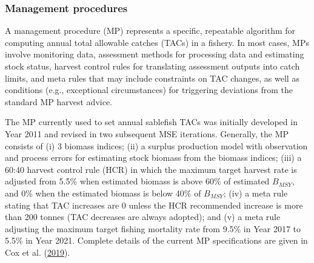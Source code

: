 \documentclass[11pt]{book}
\begin{document}
\hypertarget{management-procedures}{%
\subsubsection{Management procedures}\label{management-procedures}}

A management procedure (MP) represents a specific, repeatable algorithm for computing annual total allowable catches (TACs) in a fishery. In most cases, MPs involve monitoring data, assessment methods for processing data and estimating stock status, harvest control rules for translating assessment outputs into catch limits, and meta rules that may include constraints on TAC changes, as well as conditions (e.g., exceptional circumstances) for triggering deviations from the standard MP harvest advice.

The MP currently used to set annual sablefish TACs was initially developed in Year 2011 and revised in two subsequent MSE iterations. Generally, the MP consists of (i) 3 biomass indices; (ii) a surplus production model with observation and process errors for estimating stock biomass from the biomass indices; (iii) a 60:40 harvest control rule (HCR) in which the maximum target harvest rate is adjusted from 5.5\% when estimated biomass is above 60\% of estimated \(B_{MSY}\), and 0\% when the estimated biomass is below 40\% of \(B_{MSY}\); (iv) a meta rule stating that TAC increases are 0 unless the HCR recommended increase is more than 200 tonnes (TAC decreases are always adopted); and (v) a meta rule adjusting the maximum target fishing mortality rate from 9.5\% in Year 2017 to 5.5\% in Year 2021. Complete details of the current MP specifications are given in Cox et al. (\protect\hyperlink{ref-cox2019evaluating}{2019}).
\end{document}
